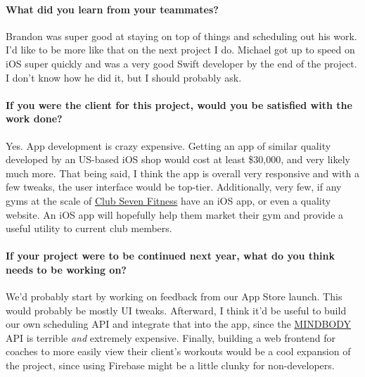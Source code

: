 \paragraph{What did you learn from your
teammates?}\label{what-did-you-learn-from-your-teammates}

Brandon was super good at staying on top of things and scheduling out
his work. I'd like to be more like that on the next project I do.
Michael got up to speed on iOS super quickly and was a very good Swift
developer by the end of the project. I don't know how he did it, but I
should probably ask.

\paragraph{If you were the client for this project, would you be
satisfied with the work
done?}\label{if-you-were-the-client-for-this-project-would-you-be-satisfied-with-the-work-done}

Yes. App development is crazy expensive. Getting an app of similar
quality developed by an US-based iOS shop would cost at least \$30,000,
and very likely much more. That being said, I think the app is overall
very responsive and with a few tweaks, the user interface would be
top-tier. Additionally, very few, if any gyms at the scale of
\href{http://www.clubsevenfitness.com/}{Club Seven Fitness} have an iOS
app, or even a quality website. An iOS app will hopefully help them
market their gym and provide a useful utility to current club members.

\paragraph{If your project were to be continued next year, what do you
think needs to be working
on?}\label{if-your-project-were-to-be-continued-next-year-what-do-you-think-needs-to-be-working-on}

We'd probably start by working on feedback from our App Store launch.
This would probably be mostly UI tweaks. Afterward, I think it'd be
useful to build our own scheduling API and integrate that into the app,
since the \href{https://www.mindbodyonline.com/}{MINDBODY} API is
terrible \emph{and} extremely expensive. Finally, building a web
frontend for coaches to more easily view their client's workouts would
be a cool expansion of the project, since using Firebase might be a
little clunky for non-developers.
